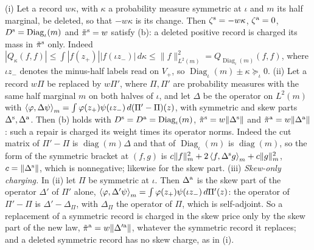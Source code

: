 \begin{remark}\label{rem:cp:charging}
(i) Let a record $w\kappa$, with $\kappa$ a probability measure symmetric at
$\iota$ and $m$ its half marginal, be deleted, so that $-w\kappa$ is its
change. Then $\zeta^{\rm s}=-w\kappa$, $\zeta^{\rm a}=0$, $D^{\rm
s}=\operatorname{Diag}_\iota(m)$ and $\tilde\pi^{\rm s}=w$ satisfy (b): a
deleted positive record is charged its mass in $\tilde\pi^{\rm s}$ only.
Indeed $|Q_\kappa(f,f)|\le\int|f(z_+)||f(\iota z_-)|\,d\kappa\le
\|f\|_{L^2(m)}^2=Q_{\operatorname{Diag}_\iota(m)}(f,f)$, where $\iota z_-$
denotes the minus-half labels read on $V_+$, so
$\operatorname{Diag}_\iota(m)\pm\kappa\succeq_\iota0$.
(ii) Let a record $w\Pi$ be replaced by $w\Pi'$, where $\Pi,\Pi'$ are
probability measures with the same half marginal $m$ on both halves of
$\iota$, and let $\Delta$ be the operator on $L^2(m)$ with
$\left\langle \varphi,\Delta\psi\right\rangle_m=\int\varphi(z_+)\psi(\iota z_-)\,d(\Pi'-\Pi)(z)$, with
symmetric and skew parts $\Delta^{\rm s},\Delta^{\rm a}$. Then (b) holds with
$D^{\rm s}=D^{\rm a}=\operatorname{Diag}_\iota(m)$,
$\tilde\pi^{\rm s}=w\|\Delta^{\rm s}\|$ and $\tilde\pi^{\rm a}=w\|\Delta^{\rm
a}\|$: such a repair is charged its weight times its operator norms. Indeed
the cut matrix of $\Pi'-\Pi$ is $\operatorname{diag}(m)\Delta$ and that of
$\operatorname{Diag}_\iota(m)$ is $\operatorname{diag}(m)$, so the form of the
symmetric bracket at $(f,g)$ is
$c\|f\|_m^2+2\left\langle f,\Delta^{\rm s}g\right\rangle_m+c\|g\|_m^2$, $c=\|\Delta^{\rm s}\|$, which
is nonnegative; likewise for the skew part.
(iii) \emph{Skew-only charging.} In (ii) let $\Pi$ be symmetric at $\iota$.
Then $\Delta^{\rm a}$ is the skew part of the operator $\Delta'$ of $\Pi'$
alone, $\left\langle \varphi,\Delta'\psi\right\rangle_m=\int\varphi(z_+)\psi(\iota z_-)\,d\Pi'(z)$:
the operator of $\Pi'-\Pi$ is $\Delta'-\Delta_\Pi$, with $\Delta_\Pi$ the
operator of $\Pi$, which is self-adjoint. So a replacement of a symmetric
record is charged in the skew price only by the skew part of the new law,
$\tilde\pi^{\rm a}=w\|\Delta'^{\rm a}\|$, whatever the symmetric record it
replaces; and a deleted symmetric record has no skew charge, as in (i).
\end{remark}

